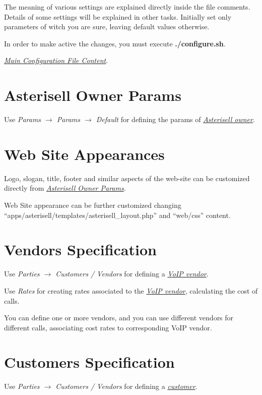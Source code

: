\documentclass[letterpaper,10pt,english]{sphinxmanual}
\begin{document}
The meaning of various settings are explained directly inside the file comments. Details of some settings will be explained in other tasks. Initially set only parameters of witch you are sure, leaving default values otherwise.

In order to make active the changes, you must execute \textbf{./configure.sh}.

{\hyperref[index:main-configuration-file]{\emph{Main Configuration File Content}}}.


\section{Asterisell Owner Params}
\label{index:asterisell-owner}\label{index:asterisell-owner-params}
Use \emph{Params \(\rightarrow\) Params \(\rightarrow\) Default} for defining the params of {\hyperref[index:term-asterisell-owner]{\emph{Asterisell owner}}}.


\section{Web Site Appearances}
\label{index:web-site-appearances}
Logo, slogan, title, footer and similar aspects of the web-site can be customized directly from {\hyperref[index:asterisell-owner]{\emph{Asterisell Owner Params}}}.

Web Site appearance can be further customized changing ``apps/asterisell/templates/asterisell\_layout.php'' and ``web/css'' content.


\section{Vendors Specification}
\label{index:vendors-specification}\label{index:id2}
Use \emph{Parties \(\rightarrow\) Customers / Vendors} for defining a {\hyperref[index:term-voip-vendor]{\emph{VoIP vendor}}}.

Use \emph{Rates} for creating rates associated to the {\hyperref[index:term-voip-vendor]{\emph{VoIP vendor}}}, calculating the cost of calls.

You can define one or more vendors, and you can use different vendors for different calls, associating cost rates to corresponding VoIP vendor.


\section{Customers Specification}
\label{index:customers-specification}
Use \emph{Parties \(\rightarrow\) Customers / Vendors} for defining a {\hyperref[index:term-customer]{\emph{customer}}}.
\end{document}
